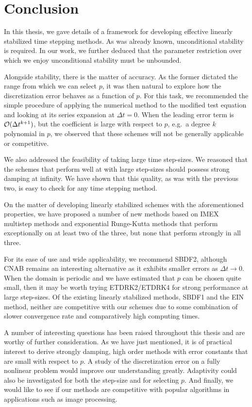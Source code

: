 \chapter{Conclusion}
In this thesis, we gave details of a framework for developing effective linearly stabilized time stepping methods. As was already known, unconditional stability is required. In our work, we further deduced that the parameter restriction over which we enjoy unconditional stability must be unbounded. 

Alongside stability, there is the matter of accuracy. As the former dictated the range from which we can select $p$, it was then natural to explore how the discretization error behaves as a function of $p$. For this task, we recommended the simple procedure of applying the numerical method to the modified test equation and looking at its series expansion at $\Delta t = 0$. When the leading error term is $\mathcal{O}(\Delta t^{k+1})$, but the coefficient is large with respect to $p$, e.g.\ a degree $k$ polynomial in $p$, we observed that these schemes will not be generally applicable or competitive.

We also addressed the feasibility of taking large time step-sizes. We reasoned that the schemes that perform well at with large step-sizes should possess strong damping at infinity. We have shown that this quality, as was with the previous two, is easy to check for any time stepping method.

On the matter of developing linearly stabilized schemes with the aforementioned properties, we have proposed a number of new methods based on IMEX multistep methods and exponential Runge-Kutta methods that perform exceptionally on at least two of the three, but none that perform strongly in all three.

For its ease of use and wide applicability, we recommend SBDF2, although CNAB remains an interesting alternative as it exhibits smaller errors as $\Delta t \to 0$. When the domain is periodic and we have estimated that $p$ can be chosen quite small, then it may be worth trying ETDRK2/ETDRK4 for strong performance at large step-sizes.
Of the existing linearly stabilized methods, SBDF1 and the EIN method, neither are competitive with our schemes due to some combination of slower convergence rate and comparatively high computing times.

A number of interesting questions has been raised throughout this thesis and are worthy of further consideration. As we have just mentioned, it is of practical interest to derive strongly damping, high order methods with error constants that are small with respect to $p$. A study of the discretization error on a fully nonlinear problem would improve our understanding greatly. Adaptivity could also be investigated for both the step-size and for selecting $p$. And finally, we would like to see if our methods are competitive with popular algorithms in applications such as image processing. 



